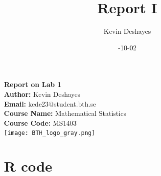 \documentclass{report}
\title{Report I}
\author{Kevin Deshayes}
\date{\2024-10-02}
\begin{document}
\begin{titlepage}
    \centering
    {\huge\bfseries Report on Lab 1 \\[1cm]}  %
    \textbf{Author:} Kevin Deshayes\\[0.5cm]  %
    \textbf{Email:} kede23@student.bth.se\\[0.5cm]  %
    \textbf{Course Name:} Mathematical Statistics \\[0.5cm]  %
    \textbf{Course Code:} MS1403\\[1.5cm]  %
    
    \texttt{[image: BTH\_logo\_gray.png]} %
    \vfill
    \vspace{2cm}
\end{titlepage}

\tableofcontents
\newpage
\section{R code}
\end{document}
